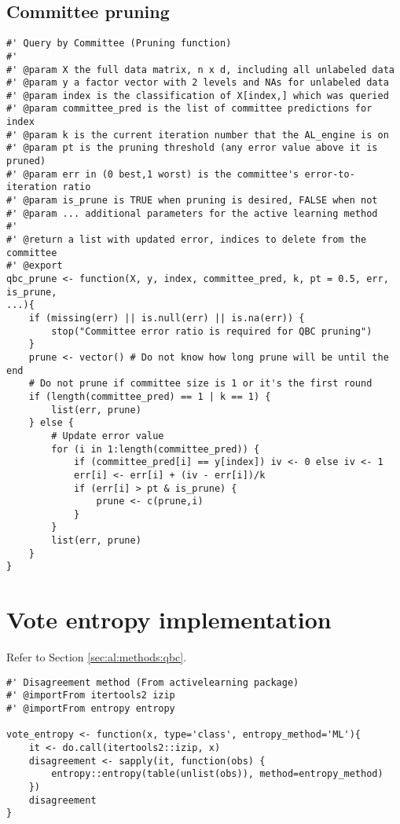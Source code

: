 \subsection{Committee pruning}
{
\begin{lstlisting}
#' Query by Committee (Pruning function)
#'
#' @param X the full data matrix, n x d, including all unlabeled data
#' @param y a factor vector with 2 levels and NAs for unlabeled data
#' @param index is the classification of X[index,] which was queried
#' @param committee_pred is the list of committee predictions for index
#' @param k is the current iteration number that the AL_engine is on
#' @param pt is the pruning threshold (any error value above it is pruned)
#' @param err in (0 best,1 worst) is the committee's error-to-iteration ratio
#' @param is_prune is TRUE when pruning is desired, FALSE when not
#' @param ... additional parameters for the active learning method
#'
#' @return a list with updated error, indices to delete from the committee
#' @export
qbc_prune <- function(X, y, index, committee_pred, k, pt = 0.5, err, is_prune, 
...){
	if (missing(err) || is.null(err) || is.na(err)) {
		stop("Committee error ratio is required for QBC pruning")
	}
	prune <- vector() # Do not know how long prune will be until the end
	# Do not prune if committee size is 1 or it's the first round
	if (length(committee_pred) == 1 | k == 1) {
		list(err, prune)
	} else {
		# Update error value
		for (i in 1:length(committee_pred)) {
			if (committee_pred[i] == y[index]) iv <- 0 else iv <- 1
			err[i] <- err[i] + (iv - err[i])/k
			if (err[i] > pt & is_prune) {
				prune <- c(prune,i)
			}
		}
		list(err, prune)
	}
}
\end{lstlisting}
}

\section{Vote entropy implementation}
\label{sec:appendicies:al:entropy}

Refer to Section \ref{sec:al:methods:qbc}.
{
	\begin{lstlisting}
#' Disagreement method (From activelearning package)
#' @importFrom itertools2 izip
#' @importFrom entropy entropy

vote_entropy <- function(x, type='class', entropy_method='ML'){
	it <- do.call(itertools2::izip, x)
	disagreement <- sapply(it, function(obs) {
		entropy::entropy(table(unlist(obs)), method=entropy_method)
	})
	disagreement
}
\end{lstlisting}
}



